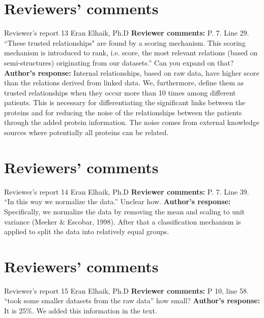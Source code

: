 \documentclass{bmcart}
\begin{document}
\begin{backmatter}
\section*{Reviewers' comments}
\newline Reviewer's report 13
\newline Eran Elhaik, Ph.D
\newline \textbf{Reviewer comments:}
P. 7. Line 29. “These trusted relationships" are found by a scoring mechanism. This scoring mechanism is introduced to rank, i.e. score, the most relevant relations (based on semi-structures) originating from our datasets.” Can you expand on that?
\newline \textbf{Author's response:}
Internal relationships, based on raw data, have higher score than the relations derived from linked data. We, furthermore, define them as trusted relationships when they occur more than 10 times among different patients. This is necessary for differentiating the significant links between the proteins and for reducing the noise of the relationships between the patients through the added protein information. The noise comes from external knowledge sources where potentially all proteins can be related.

\section*{Reviewers' comments}
\newline Reviewer's report 14
\newline Eran Elhaik, Ph.D
\newline \textbf{Reviewer comments:}
P. 7. Line 39. “In this way we normalize the data.” Unclear how.
\newline \textbf{Author's response:}
Specifically, we normalize the data by removing the mean and scaling to unit variance (Meeker & Escobar, 1998). After that a classification mechanism is applied to split the data into relatively equal groups.

\section*{Reviewers' comments}
\newline Reviewer's report 15
\newline Eran Elhaik, Ph.D
\newline \textbf{Reviewer comments:}
P 10, line 58. “took some smaller datasets from the raw data” how small?
\newline \textbf{Author's response:}
It is 25\%. We added this information in the text.


\end{backmatter}
\end{document}

